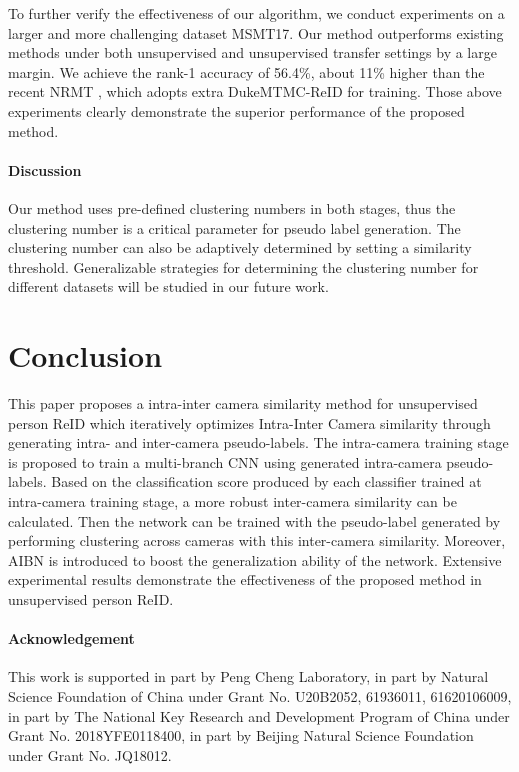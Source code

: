 \documentclass[final]{cvpr}
\begin{document}
To further verify the effectiveness of our algorithm, we conduct experiments on a larger and more challenging dataset MSMT17.
Our method outperforms existing methods under both unsupervised and unsupervised transfer settings by a large margin. We achieve the rank-1 accuracy of 56.4\%, about 11\% higher than the recent NRMT \cite{zhao2020unsupervised}, which adopts extra DukeMTMC-ReID for training. Those above experiments clearly demonstrate the superior performance of the proposed method.
\vspace{-4mm}
\paragraph{Discussion} Our method uses pre-defined clustering numbers in both stages, thus the clustering number is a critical parameter for pseudo label generation.
The clustering number can also be adaptively determined by setting a similarity threshold. Generalizable strategies for determining the clustering number for different datasets will be studied in our future work.

\vspace{-2mm}
\section{Conclusion}
This paper proposes a intra-inter camera similarity method for unsupervised person ReID which iteratively optimizes Intra-Inter Camera similarity through generating intra- and inter-camera pseudo-labels.
The intra-camera training stage is proposed to train a multi-branch CNN using generated intra-camera pseudo-labels.
Based on the classification score produced by each classifier trained at intra-camera training stage, a more robust inter-camera similarity can be calculated. Then the network can be trained with the pseudo-label generated by performing clustering across cameras with this inter-camera similarity.
Moreover, AIBN is introduced to boost the generalization ability of the network.
Extensive experimental results demonstrate the effectiveness of the proposed method in unsupervised person ReID.

\vspace{-4mm}
\paragraph{Acknowledgement} This work is supported in part by Peng Cheng Laboratory, in part by Natural Science Foundation of China under Grant No. U20B2052, 61936011, 61620106009, in part by The National Key Research and Development Program of China under Grant No. 2018YFE0118400, in part by Beijing Natural Science Foundation under Grant No. JQ18012.
\cleardoublepage

{\small
	
	
}
\end{document}
